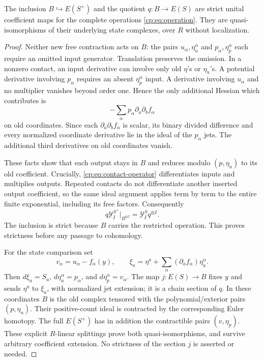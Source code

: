 \begin{theorem}\label{cp:thm:quotient}
The inclusion \(B\hookrightarrow E(S^+)\) and the quotient
\(q:B\to E(S)\) are strict unital coefficient maps for the complete
operations \eqref{cp:eq:operation}.  They are quasi-isomorphisms
of their underlying state complexes, over \(R\) without localization.
\end{theorem}

\begin{proof}
Neither new free contraction acts on \(B\): the pairs
\(u_\alpha,\eta_u^\alpha\) and \(p_\alpha,\eta_p^\alpha\)
each require an omitted input generator.  Translation preserves the
omission.  In a nonzero contact, an input derivative can involve
only old \(\eta\)'s or \(\eta_u\)'s.  A potential derivative
involving \(p_\alpha\) requires an absent \(\eta_p^\alpha\)
input.  A derivative involving \(u_\alpha\) and no multiplier
vanishes beyond order one.  Hence the only additional Hessian
which contributes is
\[
 -\sum_\alpha p_\alpha\partial_a\partial_bf_\alpha
\]
on old coordinates.  Since each \(\partial_a\partial_bf_\alpha\)
is scalar, its binary divided difference and every normalized
coordinate derivative lie in the ideal of the \(p_\alpha\) jets.
The additional third derivatives on old coordinates vanish.

These facts show that each output stays in \(B\) and reduces
modulo \((p,\eta_u)\) to its old coefficient.  Crucially,
\eqref{cp:eq:contact-operator} differentiates inputs and multiplies
outputs.  Repeated contacts do not differentiate another inserted
output coefficient, so the same ideal argument applies term by
term to the entire finite exponential, including its free factors.
Consequently
\begin{equation}\label{cp:eq:strict}
 q\mathcal Y_I^{S^+}\big|_{B^{\otimes I}}
          =\mathcal Y_I^S q^{\otimes I}.
\end{equation}
The inclusion is strict because \(B\) carries the restricted
operation.  This proves strictness before any passage to cohomology.

For the state comparison set
\[
 v_\alpha=u_\alpha-f_\alpha(y),\qquad
 \xi_a=\eta^a+\sum_\alpha(\partial_a f_\alpha)\eta_u^\alpha.
\]
Then \(d\xi_a=S_a\), \(d\eta_u^\alpha=p_\alpha\), and
\(d\eta_p^\alpha=v_\alpha\).
The map \(j:E(S)\to B\) fixes \(y\) and sends \(\eta^a\)
to \(\xi_a\), with normalized jet extension; it is a chain
section of \(q\).  In these coordinates \(B\) is the old complex
tensored with the polynomial/exterior pairs \((p,\eta_u)\).
Their positive-count ideal is contracted by the corresponding
Euler homotopy.  The full \(E(S^+)\) has in addition the
contractible pairs \((v,\eta_p)\).  These explicit \(R\)-linear
splittings prove both quasi-isomorphisms, and survive arbitrary
coefficient extension.  No strictness of the section \(j\) is
asserted or needed.
\end{proof}

